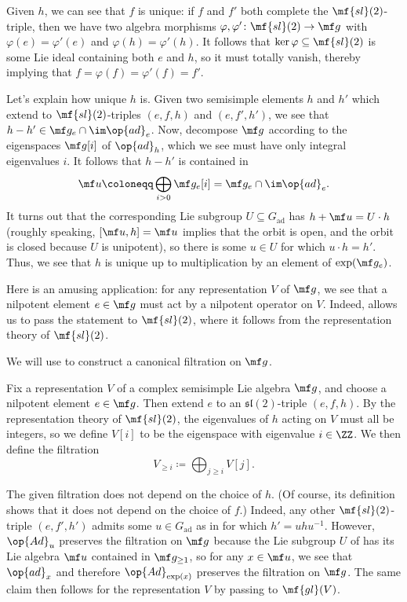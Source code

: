 \documentclass[../notes.tex]{subfiles}
\begin{document}
\begin{remark}
	Given $h$, we can see that $f$ is unique: if $f$ and $f'$ both complete the $\mf{sl}(2)$-triple, then we have two algebra morphisms $\varphi,\varphi'\colon\mf{sl}(2)\to\mf g$ with $\varphi(e)=\varphi'(e)$ and $\varphi(h)=\varphi'(h)$. It follows that $\ker\varphi\subseteq\mf{sl}(2)$ is some Lie ideal containing both $e$ and $h$, so it must totally vanish, thereby implying that $f=\varphi(f)=\varphi'(f)=f'$.
\end{remark}
\begin{remark} \label{rem:h-uniq-jacboson-morosov}
	Let's explain how unique $h$ is. Given two semisimple elements $h$ and $h'$ which extend to $\mf{sl}(2)$-triples $(e,f,h)$ and $(e,f',h')$, we see that $h-h'\in\mf g_e\cap\im\op{ad}_e$. Now, decompose $\mf g$ according to the eigenspaces $\mf g[i]$ of $\op{ad}_h$, which we see must have only integral eigenvalues $i$. It follows that $h-h'$ is contained in
	\[\mf u\coloneqq\bigoplus_{i>0}\mf g_e[i]=\mf g_e\cap\im\op{ad}_e.\]
	It turns out that the corresponding Lie subgroup $U\subseteq G_{\mathrm{ad}}$ has $h+\mf u=U\cdot h$ (roughly speaking, $[\mf u,h]=\mf u$ implies that the orbit is open, and the orbit is closed because $U$ is unipotent), so there is some $u\in U$ for which $u\cdot h=h'$. Thus, we see that $h$ is unique up to multiplication by an element of $\exp(\mf g_e)$.
\end{remark}
\begin{remark}
	Here is an amusing application: for any representation $V$ of $\mf g$, we see that a nilpotent element $e\in\mf g$ must act by a nilpotent operator on $V$. Indeed,  allows us to pass the statement to $\mf{sl}(2)$, where it follows from the representation theory of $\mf{sl}(2)$.
\end{remark}
We will use  to construct a canonical filtration on $\mf g$.
\begin{definition}
	Fix a representation $V$ of a complex semisimple Lie algebra $\mf g$, and choose a nilpotent element $e\in\mf g$. Then extend $e$ to an $\mathfrak{sl}(2)$-triple $(e,f,h)$. By the representation theory of $\mf{sl}(2)$, the eigenvalues of $h$ acting on $V$ must all be integers, so we define $V[i]$ to be the eigenspace with eigenvalue $i\in\ZZ$. We then define the filtration
	\[V_{\ge i}\coloneqq\bigoplus_{j\ge i}V[j].\]
\end{definition}
\begin{remark}
	The given filtration does not depend on the choice of $h$. (Of course, its definition shows that it does not depend on the choice of $f$.) Indeed, any other $\mf{sl}(2)$-triple $(e,f',h')$ admits some $u\in G_{\mathrm{ad}}$ as in  for which $h'=uhu^{-1}$. However, $\op{Ad}_u$ preserves the filtration on $\mf g$ because the Lie subgroup $U$ of  has its Lie algebra $\mf u$ contained in $\mf g_{\ge1}$, so for any $x\in\mf u$, we see that $\op{ad}_x$ and therefore $\op{Ad}_{\exp(x)}$ preserves the filtration on $\mf g$. The same claim then follows for the representation $V$ by passing to $\mf{gl}(V)$.
\end{remark}
\end{document}
